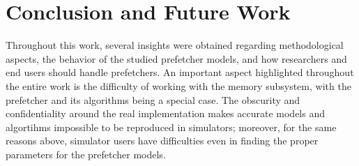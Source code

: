 \documentclass[AMA,final,STIX1COL]{WileyNJD-v2}
\begin{document}

\section{Conclusion and Future Work}\label{sec:conclusion}
Throughout this work, several insights were obtained regarding methodological aspects, the behavior of the studied prefetcher models, and how researchers and end users should handle prefetchers. 
An important aspect highlighted throughout the entire work is the difficulty of working with the memory subsystem, with the prefetcher and its algorithms being a special case.
The obscurity and confidentiality around the real implementation makes accurate models and algortihms impossible to be reproduced in simulators; moreover, for the same reasons above, simulator users have difficulties even in finding the proper parameters for the prefetcher models.
\end{document}
